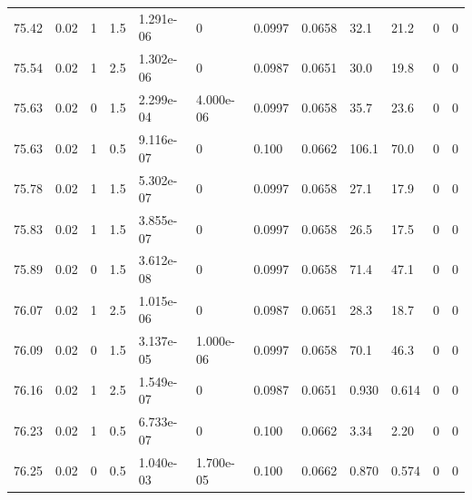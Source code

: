 \documentclass[preview]{standalone}
\begin{document}
{{{{{{{{{{{{{{{{{\begin{tabular}{L{1.2cm}C{1.2cm} C{0.3cm}C{0.5cm} C{1.4cm}C{1.4cm} C{1.4cm}C{1.4cm} C{1.6cm}C{1.6cm} C{1.6cm}C{1.6cm}}
  75.42  &  0.02  & 1     & 1.5 &  1.291e-06  & 0  &  0.0997&   0.0658& 32.1 & 21.2   &  0 & 0  \\ 
  75.54  &  0.02  & 1     & 2.5 &  1.302e-06  & 0  &  0.0987&   0.0651& 30.0 & 19.8   &  0 & 0  \\ 
  75.63  &  0.02  & 0     & 1.5 &  2.299e-04  & 4.000e-06  &  0.0997&   0.0658& 35.7 & 23.6   &  0 & 0  \\ 
  75.63  &  0.02  & 1     & 0.5 &  9.116e-07  & 0  &  0.100&   0.0662& 106.1 & 70.0   &  0 & 0  \\ 
  75.78  &  0.02  & 1     & 1.5 &  5.302e-07  & 0  &  0.0997&   0.0658& 27.1 & 17.9   &  0 & 0  \\ 
  75.83  &  0.02  & 1     & 1.5 &  3.855e-07  & 0  &  0.0997&   0.0658& 26.5 & 17.5   &  0 & 0  \\ 
  75.89  &  0.02  & 0     & 1.5 &  3.612e-08  & 0  &  0.0997&   0.0658& 71.4 & 47.1   &  0 & 0  \\ 
  76.07  &  0.02  & 1     & 2.5 &  1.015e-06  & 0  &  0.0987&   0.0651& 28.3 & 18.7   &  0 & 0  \\ 
  76.09  &  0.02  & 0     & 1.5 &  3.137e-05  & 1.000e-06  &  0.0997&   0.0658& 70.1 & 46.3   &  0 & 0  \\ 
  76.16  &  0.02  & 1     & 2.5 &  1.549e-07  & 0  &  0.0987&   0.0651& 0.930 & 0.614   &  0 & 0  \\ 
  76.23  &  0.02  & 1     & 0.5 &  6.733e-07  & 0  &  0.100&   0.0662& 3.34 & 2.20   &  0 & 0  \\ 
  76.25  &  0.02  & 0     & 0.5 &  1.040e-03  & 1.700e-05  &  0.100&   0.0662& 0.870 & 0.574   &  0 & 0  \\ 
\hline 
\end{tabular} 

}}}}}}}}}}}}}}}}}
\end{document}

